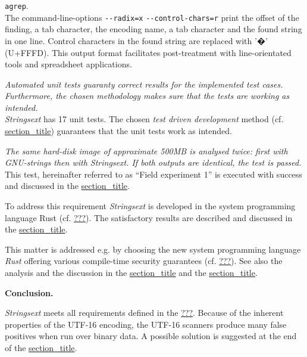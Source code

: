 \begin{description}
{\texttt{agrep}.}\\
The command-line-options \texttt{-\/-radix=x}
\texttt{-\/-control-chars=r} print the offset of the finding, a tab
character, the encoding name, a tab character and the found string in
one line. Control characters in the found string are replaced with '�'
(U+FFFD). This output format facilitates post-treatment with
line-orientated tools and spreadsheet applications.
\item[{\protect\hyperlink{automated-test-framework}{section\_title}}]
\emph{Automated unit tests guaranty correct results for the implemented
test cases. Furthermore, the chosen methodology makes sure that the
tests are working as intended.}\\
\emph{Stringsext} has 17 unit tests. The chosen \emph{test driven
development} method (cf.
\protect\hyperlink{_development_cycle}{section\_title}) guarantees that
the unit tests work as intended.
\item[{\protect\hyperlink{functionality-oriented-validation}{section\_title}}]
\emph{The same hard-disk image of approximate 500MB is analysed twice:
first with GNU-strings then with Strings­ext. If both outputs are
identical, the test is passed.}\\
This test, hereinafter referred to as ``Field experiment 1'' is executed
with success and discussed in the
\protect\hyperlink{_benchmarking_and_field_experiment}{section\_title}.
\item[{\protect\hyperlink{efficiency-and-speed}{section\_title}}]
To address this requirement \emph{Strings­ext} is developed in the
system programming language Rust (cf. \protect\hyperlink{rust}{???}).
The satisfactory results are described and discussed in the
\protect\hyperlink{_benchmarking_and_field_experiment}{section\_title}.
\item[{\protect\hyperlink{security2}{section\_title}}]
This matter is addressed e.g. by choosing the new system programming
language \emph{Rust} offering various compile-time security guarantees
(cf. \protect\hyperlink{rust}{???}). See also the analysis and the
discussion in the \protect\hyperlink{security1}{section\_title} and the
\protect\hyperlink{security2}{section\_title}.
\end{description}

\textbf{Conclusion.}

\emph{Strings­ext} meets all requirements defined in the
\protect\hyperlink{_specifications}{???}. Because of the inherent
properties of the UTF-16 encoding, the UTF-16 scanners produce many
false positives when run over binary data. A possible solution is
suggested at the end of the
\protect\hyperlink{_utf_16_encoded_input}{section\_title}.

